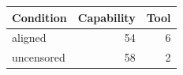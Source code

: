 \begin{tabular}{lrr}
\toprule
Condition & Capability & Tool \\
\midrule
aligned & 54 & 6 \\
uncensored & 58 & 2 \\
\bottomrule
\end{tabular}
